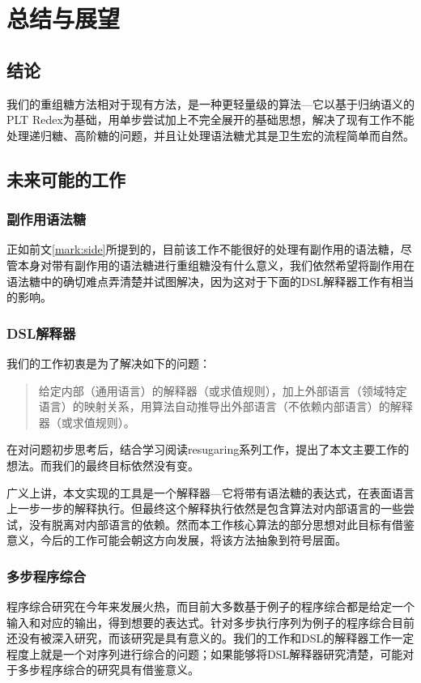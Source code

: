 \pagestyle{fancy}
\normalsize
\linespread{1.5}\selectfont
\label{mark:chapter6}\chapter{总结与展望}
\section{结论}
我们的重组糖方法相对于现有方法，是一种更轻量级的算法---它以基于归纳语义的PLT Redex为基础，用单步尝试加上不完全展开的基础思想，解决了现有工作不能处理递归糖、高阶糖的问题，并且让处理语法糖尤其是卫生宏的流程简单而自然。

\section{未来可能的工作}

\subsection{副作用语法糖}

正如前文\ref{mark:side}所提到的，目前该工作不能很好的处理有副作用的语法糖，尽管本身对带有副作用的语法糖进行重组糖没有什么意义，我们依然希望将副作用在语法糖中的确切难点弄清楚并试图解决，因为这对于下面的DSL解释器工作有相当的影响。

\subsection{DSL解释器}
我们的工作初衷是为了解决如下的问题：

\begin{quote}
	给定内部（通用语言）的解释器（或求值规则），加上外部语言（领域特定语言）的映射关系，用算法自动推导出外部语言（不依赖内部语言）的解释器（或求值规则）。
\end{quote}

在对问题初步思考后，结合学习阅读resugaring系列工作，提出了本文主要工作的想法。而我们的最终目标依然没有变。

广义上讲，本文实现的工具是一个解释器---它将带有语法糖的表达式，在表面语言上一步一步的解释执行。但最终这个解释执行依然是包含算法对内部语言的一些尝试，没有脱离对内部语言的依赖。然而本工作核心算法的部分思想对此目标有借鉴意义，今后的工作可能会朝这方向发展，将该方法抽象到符号层面。

\subsection{多步程序综合}

程序综合研究在今年来发展火热，而目前大多数基于例子的程序综合都是给定一个输入和对应的输出，得到想要的表达式。针对多步执行序列为例子的程序综合目前还没有被深入研究，而该研究是具有意义的。我们的工作和DSL的解释器工作一定程度上就是一个对序列进行综合的问题；如果能够将DSL解释器研究清楚，可能对于多步程序综合的研究具有借鉴意义。

